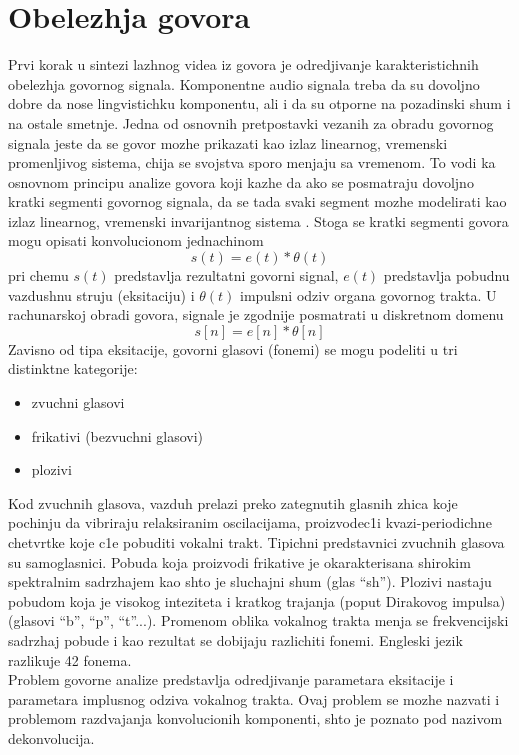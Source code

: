 \documentclass[a4paper, openany, oneside, 11pt]{book}
\begin{document}
\chapter{Obelezhja govora}\label{X}
Prvi korak u sintezi lazhnog videa iz govora je odredjivanje karakteristichnih obelezhja govornog signala. Komponentne audio signala treba da su dovoljno dobre da nose lingvistichku komponentu, ali i da su otporne na pozadinski shum i na ostale smetnje.
Jedna od osnovnih pretpostavki vezanih za obradu govornog signala jeste da se govor mozhe prikazati kao izlaz linearnog, vremenski promenljivog sistema, chija se svojstva sporo menjaju sa vremenom. To vodi ka osnovnom principu analize govora koji kazhe da ako se posmatraju dovoljno kratki segmenti govornog signala, da se tada svaki segment mozhe modelirati kao izlaz linearnog, vremenski invarijantnog sistema \cite{OPGpredavanja}. Stoga se kratki segmenti govora mogu opisati konvolucionom jednachinom
\begin{equation}\label{eq:1.1}
s(t) = e(t)*\theta(t)
\end{equation}
pri chemu $s(t)$ predstavlja rezultatni govorni signal, $e(t)$ predstavlja pobudnu vazdushnu struju (eksitaciju) i $\theta(t)$ impulsni odziv organa govornog trakta. U rachunarskoj obradi govora, signale je zgodnije posmatrati u diskretnom domenu
\begin{equation}
s[n] = e[n]*\theta[n]
\end{equation}
Zavisno od tipa eksitacije, govorni glasovi (fonemi) se mogu podeliti u tri distinktne kategorije:
\begin{itemize}[noitemsep]
\item zvuchni glasovi
\item frikativi (bezvuchni glasovi)
\item plozivi
\end{itemize}
Kod zvuchnih glasova, vazduh prelazi preko zategnutih glasnih zhica koje po\-chinju da vibriraju relaksiranim oscilacijama, proizvodec1i kvazi-periodichne chetvrtke koje c1e pobuditi vokalni trakt. Tipichni predstavnici zvuchnih glasova su samoglasnici. Pobuda koja proizvodi frikative je okarakterisana shirokim spektralnim sadrzhajem kao shto je sluchajni shum (glas \enquote{sh}). Plozivi nastaju pobudom koja je visokog inteziteta i kratkog trajanja (poput Dirakovog impulsa) (glasovi \enquote{b}, \enquote{p}, \enquote{t}...). Promenom oblika vokalnog trakta menja se frekvencijski sadrzhaj pobude i kao rezultat se dobijaju razlichiti fonemi. Engleski jezik razlikuje 42 fonema.\\
Problem govorne analize predstavlja odredjivanje parametara eksitacije i parametara implusnog odziva vokalnog trakta. Ovaj problem se mozhe nazvati i problemom razdvajanja konvolucionih komponenti, shto je poznato pod nazivom dekonvolucija.
\end{document}
